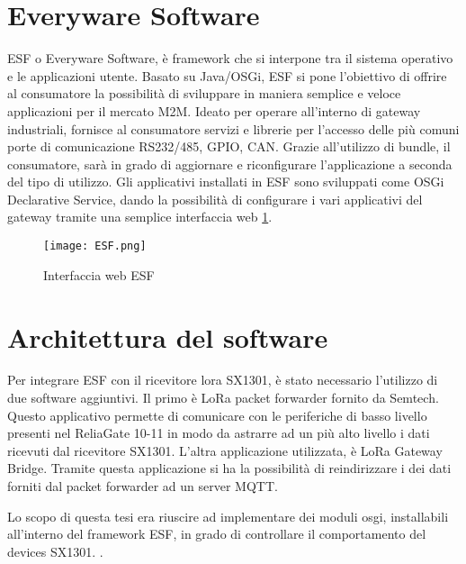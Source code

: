 \section{Everyware Software}
ESF o Everyware Software, è framework che si interpone tra il sistema operativo
e le applicazioni utente. Basato su Java/OSGi, ESF si pone l'obiettivo di
offrire al consumatore la possibilità di sviluppare in maniera semplice e veloce
applicazioni per il mercato M2M.  Ideato per operare all'interno di gateway
industriali, fornisce al consumatore servizi e librerie per l'accesso delle più
comuni porte di comunicazione RS232/485, GPIO, CAN.  Grazie all'utilizzo di
bundle, il consumatore, sarà in grado di aggiornare e riconfigurare
l'applicazione a seconda del tipo di utilizzo. Gli applicativi installati in ESF
sono sviluppati come OSGi Declarative Service, dando la possibilità di
configurare i vari applicativi del gateway tramite una semplice interfaccia web
\ref{fig:ESF_web}.


\begin{figure}[h]
        \centering 
                \texttt{[image: ESF.png]}
                \caption{Interfaccia web ESF}
        \label{fig:ESF_web}
\end{figure}

\pagebreak


\section{Architettura del software}
Per integrare ESF con il ricevitore lora SX1301, è stato necessario l'utilizzo
di due software aggiuntivi.
Il primo è LoRa packet forwarder fornito da Semtech. Questo
applicativo permette di comunicare con le periferiche di basso livello presenti
nel ReliaGate 10-11 in modo da astrarre ad un più alto livello i dati ricevuti dal
ricevitore SX1301.
L'altra applicazione utilizzata, è LoRa Gateway Bridge. Tramite questa
applicazione si ha la possibilità di 
reindirizzare i dei dati forniti dal packet forwarder ad un server MQTT.

Lo scopo di questa tesi era riuscire ad implementare dei moduli osgi,
installabili all'interno del framework ESF, in grado di controllare il
comportamento del devices SX1301.  .

